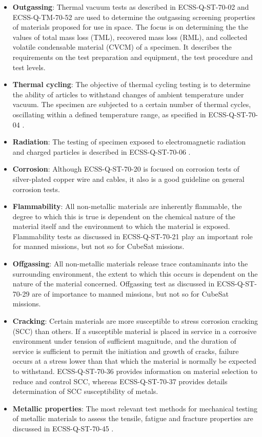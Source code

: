 \begin{itemize}
\item \textbf{Outgassing}: Thermal vacuum tests as described in ECSS-Q-ST-70-02 \cite{ECSS-Q-ST-70-02} and ECSS-Q-TM-70-52 \cite{ECSS-Q-TM-70-52} are used to determine the outgassing screening properties of materials proposed for use in space. The focus is on determining the the values of total mass loss (TML), recovered mass loss (RML), and collected volatile condensable material (CVCM) of a specimen. It describes the requirements on the test preparation and equipment, the test procedure and test levels.
\item \textbf{Thermal cycling}: The objective of thermal cycling testing is to determine the ability of articles to withstand changes of ambient temperature under vacuum. The specimen are subjected to a certain number of thermal cycles, oscillating within a defined temperature range, as specified in ECSS-Q-ST-70-04 \cite{ECSS-Q-ST-70-04}.
\item \textbf{Radiation}: The testing of specimen exposed to electromagnetic radiation and charged particles is described in ECSS-Q-ST-70-06 \cite{ECSS-Q-ST-70-06}. 
\item \textbf{Corrosion}: Although ECSS-Q-ST-70-20 \cite{ECSS-Q-ST-70-20} is focused on corrosion tests of silver-plated copper wire and cables, it also is a good guideline on general corrosion tests.
\item \textbf{Flammability}: All non-metallic materials are inherently flammable, the degree to which this is true is dependent on the chemical nature of the material itself and the environment to which the material is exposed. Flammability tests as discussed in ECSS-Q-ST-70-21 \cite{ECSS-Q-ST-70-21} play an important role for manned missions, but not so for CubeSat missions.
\item \textbf{Offgassing}: All non-metallic materials release trace contaminants into the surrounding environment, the extent to which this occurs is dependent on the nature of the material concerned. Offgassing test as discussed in ECSS-Q-ST-70-29 \cite{ECSS-Q-ST-70-29} are of importance to manned missions, but not so for CubeSat missions.
\item \textbf{Cracking}: Certain materials are more susceptible to stress corrosion cracking (SCC) than others. If a susceptible material is placed in service in a corrosive environment under tension of sufficient magnitude, and the duration of service is sufficient to permit the initiation and growth of cracks, failure occurs at a stress lower than that which the material is normally be expected to withstand. ECSS-Q-ST-70-36 \cite{ECSS-Q-ST-70-36} provides information on material selection to reduce and control SCC, whereas ECSS-Q-ST-70-37 \cite{ECSS-Q-ST-70-37} provides details determination of SCC susceptibility of metals.
\item \textbf{Metallic properties}: The most relevant test methods for mechanical testing of metallic materials to assess the tensile, fatigue and fracture properties are discussed in ECSS-Q-ST-70-45 \cite{ECSS-Q-ST-70-45}.
\end{itemize}


